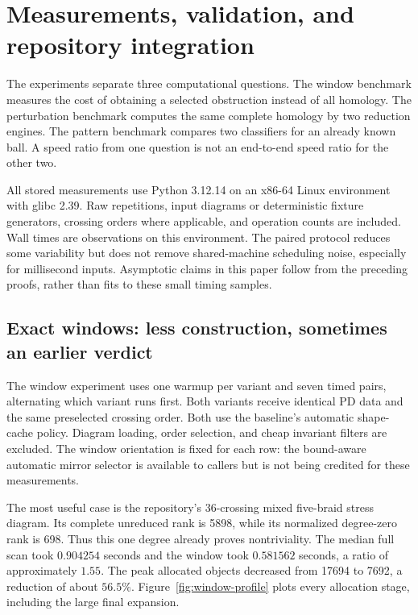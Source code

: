 \section{Measurements, validation, and repository integration}
\label{sec:experiments}

The experiments separate three computational questions.  The window
benchmark measures the cost of obtaining a selected obstruction instead
of all homology.  The perturbation benchmark computes the same complete
homology by two reduction engines.  The pattern benchmark compares two
classifiers for an already known ball.  A speed ratio from one question
is not an end-to-end speed ratio for the other two.

All stored measurements use Python 3.12.14 on an x86-64 Linux environment
with glibc 2.39.  Raw repetitions, input diagrams or deterministic fixture
generators, crossing orders where applicable, and operation counts are
included.  Wall times are observations on this environment.  The paired
protocol reduces some variability but does not remove shared-machine
scheduling noise, especially for millisecond inputs.  Asymptotic claims
in this paper follow from the preceding proofs, rather than fits to these
small timing samples.

\subsection{Exact windows: less construction, sometimes an earlier verdict}

The window experiment uses one warmup per variant and seven timed pairs,
alternating which variant runs first.  Both variants receive identical
PD data and the same preselected crossing order.  Both use the baseline's
automatic shape-cache policy.  Diagram loading, order selection, and
cheap invariant filters are excluded.  The window orientation is fixed
for each row: the bound-aware automatic mirror selector is available to
callers but is not being credited for these measurements.




The most useful case is the repository's 36-crossing mixed five-braid
stress diagram.  Its complete unreduced rank is 5898, while its normalized
degree-zero rank is 698.  Thus this one degree already proves
nontriviality.  The median full scan took $0.904254$ seconds and the
window took $0.581562$ seconds, a ratio of approximately $1.55$.
The peak allocated objects decreased from 17694 to 7692, a reduction of
about $56.5\%$.  Figure~\ref{fig:window-profile} plots every allocation
stage, including the large final expansion.

